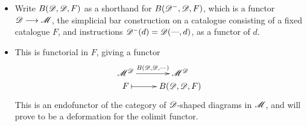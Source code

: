 \documentclass[11pt]{article}
\newcommand{\Dminus}{\scrD^\textup{\tiny$-$}}
\begin{document}
\begin{5. The unreasonably effective (co)bar construction}
\begin{itemise}
\begin{itemize}
\[{\ar[r]^-{\Dminus}%
\scrD&%
\sSet^{\scrD^{\op}}\\%
d%
\ar@{|->}[r]&
\scrD(\DASH ,d)%
}\]
\item Write $B(\mathscr{D},\mathscr{D},F)$ as a shorthand for $B(\mathscr{D}^-,\mathscr{D},F)$, which is a functor $\mathscr{D}\longrightarrow\mathscr{M}$, the simplicial bar construction on a catalogue consisting of a fixed catalogue $F$, and instructions $\Dminus(d)=\scrD(\DASH ,d)$, as a functor of $d$.
\item This is functorial in $F$, giving a functor
\[\xymatrix@R=0mm{
\ar[r]^-{B(\scrD,\scrD,\DASH )}%
\scrM^\scrD&%
\scrM^\scrD\\%
F%
\ar@{|->}[r]&
B(\scrD,\scrD,F)%
}\]
This is an endofunctor of the category of $\mathscr{D}$-shaped diagrams in $\mathscr{M}$, and will prove to be a deformation for the colimit functor.
\end{itemize}
\end{itemise}

\end{5. The unreasonably effective (co)bar construction}
\end{document}
